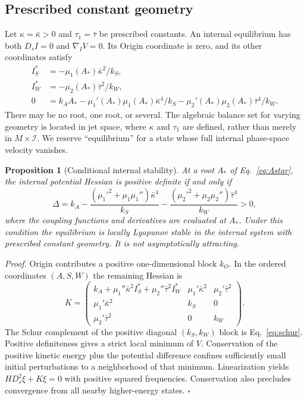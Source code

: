 \documentclass[aip,jmp,reprint,onecolumn,amsmath,amssymb]{revtex4-2}
\newcommand{\Ds}{D_s}
\newcommand{\I}{\mathcal I}
\newtheorem{proposition}{Proposition}
\begin{document}
\subsection{Prescribed constant geometry}
Let $\kappa=\bar\kappa>0$ and $\tau_1=\bar\tau$ be prescribed constants. An internal equilibrium has both $\Ds I=0$ and $\nabla_I V=0$. Its Origin coordinate is zero, and its other coordinates satisfy
\begin{align}
 I_S^*&=-\mu_1(A_*)\bar\kappa^2/k_S,\label{eq:IstarS}\\
 I_W^*&=-\mu_2(A_*)\bar\tau^2/k_W,\label{eq:IstarW}\\
 0&=k_A A_*-
 \mu_1'(A_*)\mu_1(A_*)\bar\kappa^4/k_S
 -\mu_2'(A_*)\mu_2(A_*)\bar\tau^4/k_W.\label{eq:Astar}
\end{align}
There may be no root, one root, or several. The algebraic balance set for varying geometry is located in jet space, where $\kappa$ and $\tau_1$ are defined, rather than merely in $M\times\I$. We reserve ``equilibrium'' for a state whose full internal phase-space velocity vanishes.

\begin{proposition}[Conditional internal stability]
At a root $A_*$ of Eq.~\eqref{eq:Astar}, the internal potential Hessian is positive definite if and only if
\begin{equation}
 \Delta=k_A-
 \frac{(\mu_1'^2+\mu_1\mu_1'')\bar\kappa^4}{k_S}
 -\frac{(\mu_2'^2+\mu_2\mu_2'')\bar\tau^4}{k_W}>0,
 \label{eq:schur}
\end{equation}
where the coupling functions and derivatives are evaluated at $A_*$. Under this condition the equilibrium is locally Lyapunov stable in the internal system with prescribed constant geometry. It is not asymptotically attracting.
\end{proposition}
\textit{Proof.} Origin contributes a positive one-dimensional block $k_O$. In the ordered coordinates $(A,S,W)$ the remaining Hessian is
\begin{equation}
 K=\begin{pmatrix}
 k_A+\mu_1''\bar\kappa^2I_S^*+\mu_2''\bar\tau^2I_W^*&\mu_1'\bar\kappa^2&\mu_2'\bar\tau^2\\
 \mu_1'\bar\kappa^2&k_S&0\\
 \mu_2'\bar\tau^2&0&k_W
 \end{pmatrix}.
\end{equation}
The Schur complement of the positive diagonal $(k_S,k_W)$ block is Eq.~\eqref{eq:schur}. Positive definiteness gives a strict local minimum of $V$. Conservation of the positive kinetic energy plus the potential difference confines sufficiently small initial perturbations to a neighborhood of that minimum. Linearization yields $H\Ds^2\xi+K\xi=0$ with positive squared frequencies. Conservation also precludes convergence from all nearby higher-energy states. $\square$
\end{document}
